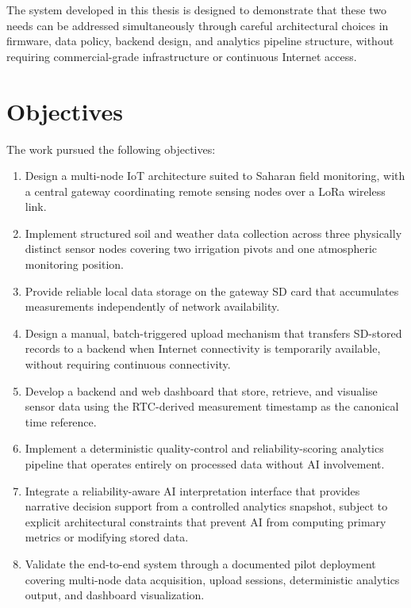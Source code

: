 The system developed in this thesis is designed to demonstrate that these two needs
can be addressed simultaneously through careful architectural choices in firmware,
data policy, backend design, and analytics pipeline structure, without requiring
commercial-grade infrastructure or continuous Internet access.

\section*{Objectives}

The work pursued the following objectives:

\begin{enumerate}
  \item Design a multi-node IoT architecture suited to Saharan field monitoring,
        with a central gateway coordinating remote sensing nodes over a LoRa
        wireless link.
  \item Implement structured soil and weather data collection across three physically
        distinct sensor nodes covering two irrigation pivots and one atmospheric
        monitoring position.
  \item Provide reliable local data storage on the gateway SD card that accumulates
        measurements independently of network availability.
  \item Design a manual, batch-triggered upload mechanism that transfers SD-stored
        records to a backend when Internet connectivity is temporarily available,
        without requiring continuous connectivity.
  \item Develop a backend and web dashboard that store, retrieve, and visualise sensor
        data using the RTC-derived measurement timestamp as the canonical time
        reference.
  \item Implement a deterministic quality-control and reliability-scoring analytics
        pipeline that operates entirely on processed data without AI involvement.
  \item Integrate a reliability-aware AI interpretation interface that provides
        narrative decision support from a controlled analytics snapshot, subject to
        explicit architectural constraints that prevent AI from computing primary
        metrics or modifying stored data.
  \item Validate the end-to-end system through a documented pilot deployment covering
        multi-node data acquisition, upload sessions, deterministic analytics
        output, and dashboard visualization.
\end{enumerate}

